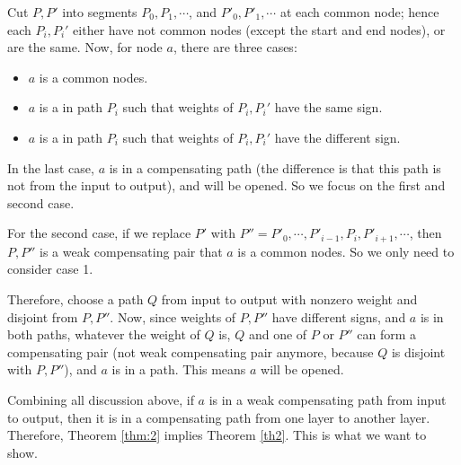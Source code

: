 			Cut $P,P'$ into segments $P_0,P_1,\cdots$, and $P'_0,P'_1,\cdots$ at each common node; hence each $P_i,P_i'$ either have not common nodes (except the start and end nodes), or are the same. Now, for node $a$, there are three cases:
			\begin{itemize}
				\item $a$ is a common nodes.
				
				\item  $a$ is a in path $P_i$ such that weights of $P_i,P_i'$ have the same sign.
				
				\item  $a$ is a in path $P_i$ such that weights of $P_i,P_i'$ have the different sign.
			\end{itemize}
			
			In the last case, $a$ is in a compensating path (the difference is that this path is not from the input to output), and will be opened. So we focus on the first and second case.
			
			For the second case, if we replace $P'$ with $P''=P'_0,\cdots,P'_{i-1},P_{i},P'_{i+1},\cdots$, then $P,P''$ is a weak compensating pair that $a$ is a common nodes. So we only need to consider case 1.
			
			Therefore, choose a path $Q$ from input to output with nonzero weight and disjoint from $P,P''$. Now, since weights of $P,P''$ have different signs, and $a$ is in both paths, whatever the weight of $Q$ is, $Q$ and one of  $P$ or $P''$ can form a compensating pair (not weak compensating pair anymore, because $Q$ is disjoint with $P,P''$), and $a$ is in a path. This means $a$ will be opened.
			
			Combining all discussion above, if $a$ is in a weak compensating path from input to output, then it is in a compensating path from one layer to another layer. Therefore, Theorem \ref{thm:2} implies Theorem \ref{th2}. This is what we want to show.
			
 			
		